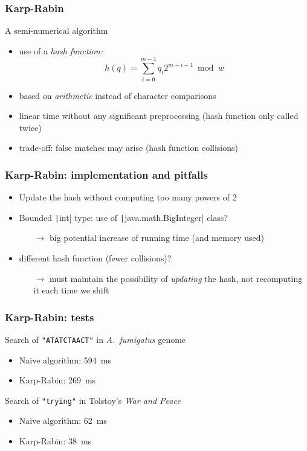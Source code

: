 \documentclass{beamer}
\begin{document}
\begin{frame}
  \frametitle{Karp-Rabin}

  \begin{block}{A semi-numerical algorithm}
    \begin{itemize}
    \item use of a \emph{hash function:}
      \[ h(q) = \sum_{i=0}^{m-1} q_i 2^{m-i-1} \bmod w \]
    \item based on \emph{arithmetic} instead of character comparisons
    \item linear time without any significant preprocessing (hash
      function only called twice)
    \item trade-off: false matches may arise (hash function collisions)
    \end{itemize}
  \end{block}

\end{frame}

\begin{frame}
  \frametitle{Karp-Rabin: implementation and pitfalls}

  \begin{itemize}
  \item Update the hash without computing too many powers of 2
  \item Bounded \texttt|int| type: use of
    \texttt|java.math.BigInteger| class?
    \begin{itemize}
    \item[$\rightarrow$] big potential increase of running time (and
      memory used)
    \end{itemize}
  \item different hash function (fewer collisions)?
    \begin{itemize}
    \item[$\rightarrow$] must maintain the possibility of
      \emph{updating} the hash, not recomputing it each time we shift
    \end{itemize}
  \end{itemize}
\end{frame}

\begin{frame}
  \frametitle{Karp-Rabin: tests}
  
  \begin{block}{Search of \texttt{"ATATCTAACT"} in \emph{A.\ fumigatus} genome}
    \begin{itemize}
    \item Naive algorithm: 594~ms
    \item Karp-Rabin: 269~ms
    \end{itemize}
  \end{block}

  \begin{block}{Search of \texttt{"trying"} in Tolstoy's \emph{War and Peace}}
    \begin{itemize}
    \item Naive algorithm: 62~ms
    \item Karp-Rabin: 38~ms
    \end{itemize}
  \end{block}
\end{frame}
\end{document}
